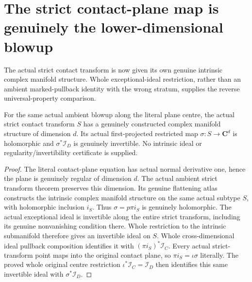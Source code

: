 \section{The strict contact-plane map is genuinely the lower-dimensional blowup}

The actual strict contact transform is now given its own genuine intrinsic
complex manifold structure. Whole exceptional-ideal restriction, rather than
an ambient marked-pullback identity with the wrong stratum, supplies the
reverse universal-property comparison.

\begin{theorem}
\label{hir:actual-plane-contact-strict-intrinsic-ideal}
\leanok
For the same actual ambient blowup along the literal plane centre, the
actual strict contact transform $S$ has a genuinely constructed complex
manifold structure of dimension $d$. Its actual first-projected restricted
map $\sigma:S\to\mathbf C^d$ is holomorphic and
$\sigma^*\mathcal I_D$ is genuinely invertible. No intrinsic ideal or
regularity/invertibility certificate is supplied.
\end{theorem}
\begin{proof}
The literal contact-plane equation has actual normal derivative one, hence
the plane is genuinely regular of dimension $d$. The actual ambient strict
transform theorem preserves this dimension. Its genuine flattening atlas
constructs the intrinsic complex manifold structure on the same actual
subtype $S$, with holomorphic inclusion $i_S$. Thus
$\sigma=p\pi i_S$ is genuinely holomorphic. The actual exceptional ideal
is invertible along the entire strict transform, including its genuine
nonvanishing condition there. Whole restriction to the intrinsic submanifold
therefore gives an invertible ideal on $S$. Whole cross-dimensional ideal
pullback composition identifies it with $(\pi i_S)^*\mathcal I_C$.
Every actual strict-transform point maps into the original contact plane,
so $\pi i_S=\iota\sigma$ literally. The proved whole original centre
restriction $\iota^*\mathcal I_C=\mathcal I_D$ then identifies this same
invertible ideal with $\sigma^*\mathcal I_D$.
\end{proof}


